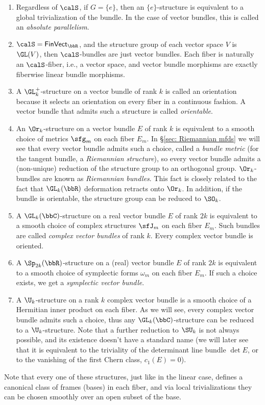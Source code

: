 \begin{example}
    \begin{enumerate}
        \item Regardless of $\calS$, if $G=\{e\}$, then an $\{e\}$-structure is equivalent to a global trivialization of the bundle. In the case of vector bundles, this is called an \emph{absolute parallelism}.
        \item $\calS=\mathsf{FinVect}_\bbR$, and the structure group of each vector space $V$ is $\GL(V)$, then $\calS$-bundles are just vector bundles. Each fiber is naturally an $\calS$-fiber, i.e., a vector space, and vector bundle morphisms are exactly fiberwise linear bundle morphisms.
        \item A $\GL_k^+$-structure on a vector bundle of rank $k$ is called an orientation because it selects an orientation on every fiber in a continuous fashion. A vector bundle that admits such a structure is called \emph{orientable}.
        \item An $\Or_k$-structure on a vector bundle $E$ of rank $k$ is equivalent to a smooth choice of metrics $\sfg_m$ on each fiber $E_m$. In \S\ref{sec: Riemannian mfds} we will see that every vector bundle admits such a choice, called a \emph{bundle metric} (for the tangent bundle, a \emph{Riemannian structure}), so every vector bundle admits a (non-unique) reduction of the structure group to an orthogonal group. $\Or_k$-bundles are known as \emph{Riemannian bundles}. This fact is closely related to the fact that $\GL_k(\bbR)$ deformation retracts onto $\Or_k$. In addition, if the bundle is orientable, the structure group can be reduced to $\SO_k$.
        \item A $\GL_k(\bbC)$-structure on a real vector bundle $E$ of rank $2k$ is equivalent to a smooth choice of complex structures $\sfJ_m$ on each fiber $E_m$. Such bundles are called \emph{complex vector bundles} of rank $k$. Every complex vector bundle is oriented.
        \item A $\Sp_{2k}(\bbR)$-structure on a (real) vector bundle $E$ of rank $2k$ is equivalent to a smooth choice of symplectic forms $\omega_m$ on each fiber $E_m$. If such a choice exists, we get a \emph{symplectic vector bundle}.
        \item A $\U_k$-structure on a rank $k$ complex vector bundle is a smooth choice of a Hermitian inner product on each fiber. As we will see, every complex vector bundle admits such a choice, thus any $\GL_k(\bbC)$-structure can be reduced to a $\U_k$-structure. Note that a further reduction to $\SU_k$ is not always possible, and its existence doesn't have a standard name (we will later see that it is equivalent to the triviality of the determinant line bundle $\det E$, or to the vanishing of the first Chern class, $c_1(E)=0$).
    \end{enumerate}
    Note that every one of these structures, just like in the linear case, defines a canonical class of frames (bases) in each fiber, and via local trivializations they can be chosen smoothly over an open subset of the base. 
\end{example}

